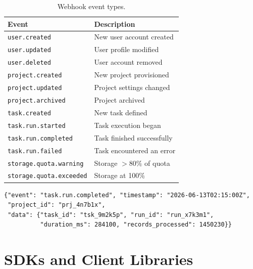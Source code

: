 \documentclass[
    language=english,
    doctype=article,
    institution=none,
]{../../omnilatex}
\begin{document}
\begin{table}[htbp]
    \centering
    \caption{Webhook event types.}
    \label{tab:webhook-events}
    \begin{tabularx}{\textwidth}{@{}lX@{}}
        \toprule
        \textbf{Event} & \textbf{Description} \\
        \midrule
        \texttt{user.created}            & New user account created \\
        \texttt{user.updated}            & User profile modified \\
        \texttt{user.deleted}            & User account removed \\
        \texttt{project.created}         & New project provisioned \\
        \texttt{project.updated}         & Project settings changed \\
        \texttt{project.archived}        & Project archived \\
        \texttt{task.created}            & New task defined \\
        \texttt{task.run.started}        & Task execution began \\
        \texttt{task.run.completed}      & Task finished successfully \\
        \texttt{task.run.failed}         & Task encountered an error \\
        \texttt{storage.quota.warning}   & Storage $>80\%$ of quota \\
        \texttt{storage.quota.exceeded}  & Storage at 100\% \\
        \bottomrule
    \end{tabularx}
\end{table}

\begin{reqbox}
\begin{verbatim}
{"event": "task.run.completed", "timestamp": "2026-06-13T02:15:00Z",
 "project_id": "prj_4n7b1x",
 "data": {"task_id": "tsk_9m2k5p", "run_id": "run_x7k3m1",
          "duration_ms": 284100, "records_processed": 1450230}}
\end{verbatim}
\end{reqbox}

\section{SDKs and Client Libraries}
\label{sec:sdks}
\end{document}
